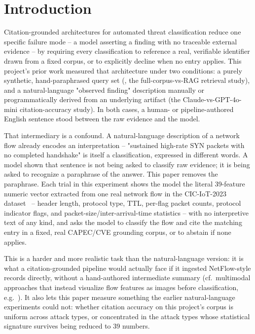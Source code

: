 \documentclass[11pt]{article}
\begin{document}
\section{Introduction}

Citation-grounded architectures for automated threat classification reduce
one specific failure mode -- a model asserting a finding with no traceable
external evidence -- by requiring every classification to reference a real,
verifiable identifier drawn from a fixed corpus, or to explicitly decline
when no entry applies. This project's prior work measured that architecture
under two conditions: a purely synthetic, hand-paraphrased query set
(\citet{clearsight2026}, the full-corpus-vs-RAG retrieval study), and a
natural-language "observed finding" description manually or programmatically
derived from an underlying artifact (the Claude-vs-GPT-4o-mini
citation-accuracy study). In both cases, a human- or pipeline-authored
English sentence stood between the raw evidence and the model.

That intermediary is a confound. A natural-language description of a
network flow already encodes an interpretation -- "sustained high-rate SYN
packets with no completed handshake" is itself a classification, expressed
in different words. A model shown that sentence is not being asked to
classify raw evidence; it is being asked to recognize a paraphrase of the
answer. This paper removes the paraphrase. Each trial in this experiment
shows the model the literal 39-feature numeric vector extracted from one
real network flow in the CIC-IoT-2023 dataset~\citep{neto2023ciciot2023} --
header length, protocol type, TTL, per-flag packet counts, protocol
indicator flags, and packet-size/inter-arrival-time statistics -- with no
interpretive text of any kind, and asks the model to classify the flow and
cite the matching entry in a fixed, real CAPEC/CVE grounding corpus, or to
abstain if none applies.

This is a harder and more realistic task than the natural-language version:
it is what a citation-grounded pipeline would actually face if it ingested
NetFlow-style records directly, without a hand-authored intermediate
summary (cf.\ multimodal approaches that instead visualize flow features as
images before classification, e.g.\ \citet{netflowviz}). It also lets this
paper measure something the earlier natural-language experiments could
not: whether citation accuracy on this project's corpus is uniform across
attack types, or concentrated in the attack types whose statistical
signature survives being reduced to 39 numbers.
\end{document}
